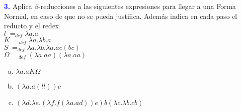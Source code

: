\textbf{\textcolor{blue}{3.}} \Large
Aplica $\beta$-reducciones a las siguientes expresiones
para llegar a una Forma Normal, en caso de que no se pueda justifica. Además indica
en cada paso el reducto y el redex.\\

$l\;=_{def} \lambda a.a$\\
$K\;=_{def} \lambda a.\lambda b.a$\\
$S\;=_{def} \lambda a.\lambda b.\lambda a.ac(bc)$\\
$\Omega\; =_{def} (\lambda a.aa) (\lambda a.aa)$

\begin{enumerate}[a)]
    \item $\lambda a.aK\Omega$
    \item $(\lambda a.a(ll))c$
    \item $(\lambda d.\lambda e.(\lambda f.f(\lambda a.ad))e)b(\lambda c.\lambda b.cb)$
\end{enumerate}
